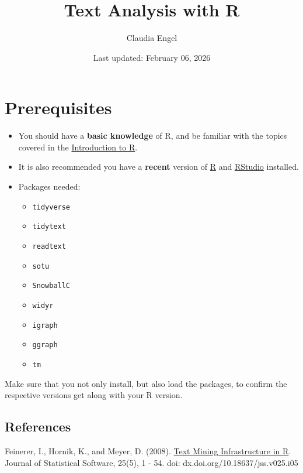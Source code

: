 \documentclass[
]{book}
\title{Text Analysis with R}
\author{Claudia Engel}
\date{Last updated: February 06, 2026}
\providecommand{\tightlist}{%
  \setlength{\itemsep}{0pt}\setlength{\parskip}{0pt}}
\begin{document}
\maketitle

{
\setcounter{tocdepth}{1}
\tableofcontents
}
\chapter*{Prerequisites}\label{prerequisites}

\begin{itemize}
\item
  You should have a \textbf{basic knowledge} of R, and be familiar with the topics covered in the \href{https://cengel.github.io/R-intro/}{Introduction to R}.
\item
  It is also recommended you have a \textbf{recent} version of \href{https://cran.r-project.org/}{R} and \href{https://www.rstudio.com/}{RStudio} installed.
\item
  Packages needed:

  \begin{itemize}
  \tightlist
  \item
    \texttt{tidyverse}
  \item
    \texttt{tidytext}
  \item
    \texttt{readtext}
  \item
    \texttt{sotu}
  \item
    \texttt{SnowballC}
  \item
    \texttt{widyr}
  \item
    \texttt{igraph}
  \item
    \texttt{ggraph}
  \item
    \texttt{tm}
  \end{itemize}
\end{itemize}

Make sure that you not only install, but also load the packages, to confirm the respective versions get along with your R version.

\section*{References}\label{references}

Feinerer, I., Hornik, K., and Meyer, D. (2008). \href{http://dx.doi.org/10.18637/jss.v025.i05}{Text Mining Infrastructure in R}. Journal of Statistical Software, 25(5), 1 - 54. doi: dx.doi.org/10.18637/jss.v025.i05
\end{document}
